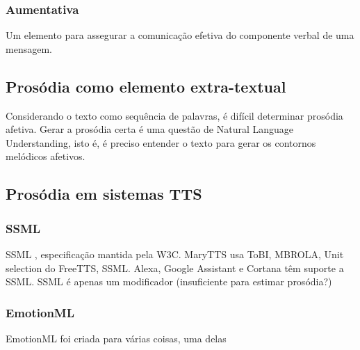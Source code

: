 \subsubsection{Aumentativa}
Um elemento para assegurar a comunicação efetiva do componente verbal de uma mensagem.
\subsection{Prosódia como elemento extra-textual}
Considerando o texto como sequência de palavras, é difícil determinar prosódia
afetiva.
Gerar a prosódia certa é uma questão de Natural Language Understanding, isto é,
é preciso entender o texto para gerar os contornos melódicos afetivos.

\subsection{Prosódia em sistemas TTS}
\subsubsection{SSML}
SSML \cite{ssml}, especificação mantida pela W3C.
MaryTTS usa ToBI, MBROLA, Unit selection do FreeTTS, SSML.
Alexa, Google Assistant e Cortana têm suporte a SSML.
SSML é apenas um modificador (insuficiente para estimar prosódia?)
\subsubsection{EmotionML}
EmotionML \cite{emotionml} foi criada para várias coisas, uma delas